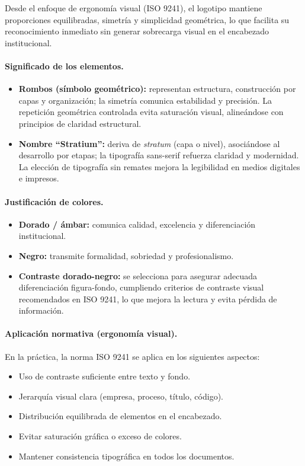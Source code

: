 \documentclass{encabezado}
\begin{document}
Desde el enfoque de ergonomía visual (ISO 9241), el logotipo mantiene proporciones equilibradas, simetría y simplicidad geométrica, lo que facilita su reconocimiento inmediato sin generar sobrecarga visual en el encabezado institucional.

\paragraph{Significado de los elementos.}
\begin{itemize}
    \item \textbf{Rombos (símbolo geométrico):} representan estructura, construcción por capas y organización; la simetría comunica estabilidad y precisión. La repetición geométrica controlada evita saturación visual, alineándose con principios de claridad estructural.
    \item \textbf{Nombre “Stratium”:} deriva de \textit{stratum} (capa o nivel), asociándose al desarrollo por etapas; la tipografía sans-serif refuerza claridad y modernidad. La elección de tipografía sin remates mejora la legibilidad en medios digitales e impresos.
\end{itemize}

\paragraph{Justificación de colores.}
\begin{itemize}
    \item \textbf{Dorado / ámbar:} comunica calidad, excelencia y diferenciación institucional.
    \item \textbf{Negro:} transmite formalidad, sobriedad y profesionalismo.
    \item \textbf{Contraste dorado-negro:} se selecciona para asegurar adecuada diferenciación figura-fondo, cumpliendo criterios de contraste visual recomendados en ISO 9241, lo que mejora la lectura y evita pérdida de información.
\end{itemize}

\paragraph{Aplicación normativa (ergonomía visual).}
En la práctica, la norma ISO 9241 se aplica en los siguientes aspectos:

\begin{itemize}
    \item Uso de contraste suficiente entre texto y fondo.
    \item Jerarquía visual clara (empresa, proceso, título, código).
    \item Distribución equilibrada de elementos en el encabezado.
    \item Evitar saturación gráfica o exceso de colores.
    \item Mantener consistencia tipográfica en todos los documentos.
\end{itemize}
\end{document}

